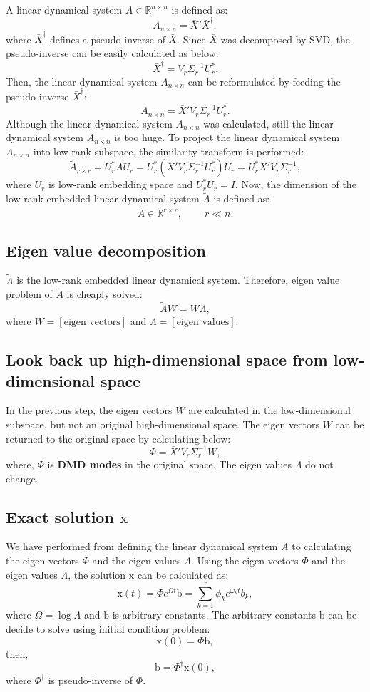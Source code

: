 \documentclass[onecolumn]{IEEEtran}
\begin{document}
A linear dynamical system $A \in \mathbb{R}^{n \times n}$ is defined as:
$$A_{n \times n} = \bar{X}' \bar{X}^{\dagger},$$
where $\bar{X}^{\dagger}$ defines a pseudo-inverse of $\bar{X}$.
Since $\bar{X}$ was decomposed by SVD, the pseudo-inverse can be easily calculated as below:
$$\bar{X}^{\dagger} = V_r \Sigma_r^{-1} U_r^*.$$
Then, the linear dynamical system $A_{n \times n}$ can be reformulated by feeding the pseudo-inverse $\bar{X}^{\dagger}$:
$$A_{n \times n} = \bar{X}' V_r \Sigma_r^{-1} U_r^*.$$
Although the linear dynamical system $A_{n \times n}$ was calculated, still the linear dynamical system $A_{n \times n}$ is too huge.
To project the linear dynamical system $A_{n \times n}$ into low-rank subspace, the similarity transform is performed:
$$\tilde{A}_{r \times r} = U_r^* A U_r=U_r^*(\bar{X}' V_r \Sigma_r^{-1}U_r^*)U_r=U_r^*\bar{X}' V_r \Sigma_r^{-1},$$
where $U_r$ is low-rank embedding space and $U_r^* U_r = I$. 
Now, the dimension of the low-rank embedded linear dynamical system $\tilde{A}$ is defined as:
$$\tilde{A} \in \mathbb{R}^{r \times r},~~~~~~~~~~r \ll n.$$

\subsection{Eigen value decomposition}

$\tilde{A}$ is the low-rank embedded linear dynamical system. Therefore, eigen value problem of $\tilde{A}$ is cheaply solved:
$$\tilde{A}W = W \Lambda,$$
where $W=[\textrm{eigen vectors}]$ and $\Lambda=[\textrm{eigen~values}]$.

\subsection{Look back up high-dimensional space from low-dimensional space}

In the previous step, the eigen vectors $W$ are calculated in the low-dimensional subspace, but not an original high-dimensional space. The eigen vectors $W$ can be returned to the original space by calculating below:
 $$\Phi = \bar{X}' V_r \Sigma_r^{-1} W,$$
 where, $\Phi$ is \textbf{DMD modes} in the original space. The eigen values $\Lambda$ do not change.

\subsection{Exact solution $\mathrm{x}$}

 We have performed from defining the linear dynamical system $A$ to calculating the eigen vectors $\Phi$ and the eigen values $\Lambda$.
Using the eigen vectors $\Phi$ and the eigen values $\Lambda$, the solution $\mathrm{x}$ can be calculated as:
$$\mathrm{x}(t) = \Phi e ^{\Omega t} \mathrm{b} = \sum_{k=1}^{r} \phi_k e^{\omega_k t}b_k,$$
where $\Omega=\log{\Lambda}$ and $\mathrm{b}$ is arbitrary constants.
The arbitrary constants $\mathrm{b}$ can be decide to solve using initial condition problem:
$$\mathrm{x}(0) = \Phi \mathrm{b},$$
then,
$$\mathrm{b} = \Phi^{\dagger} \mathrm{x}(0),$$
where $\Phi^{\dagger}$ is pseudo-inverse of $\Phi$.
\end{document}
